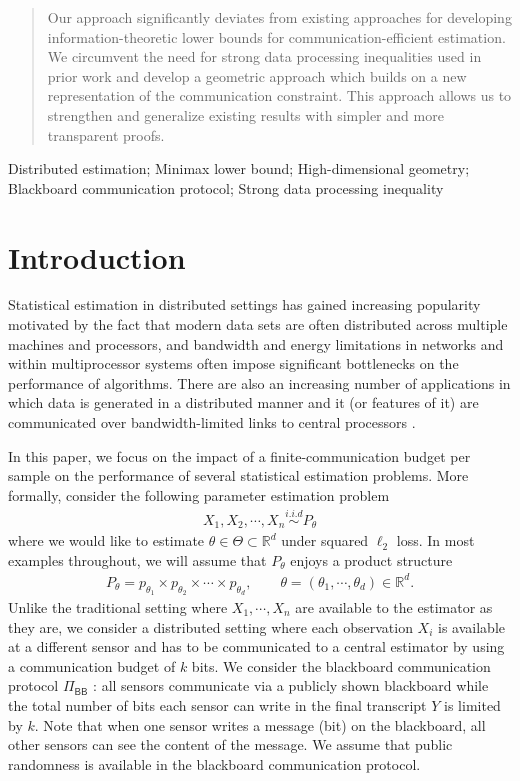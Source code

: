 \documentclass[final,12pt]{colt2018} %
\def \bR {\mathbb{R}}
\begin{document}
\begin{abstract}
Our approach significantly deviates from existing approaches for developing information-theoretic lower bounds for communication-efficient estimation. We circumvent the need
for strong data processing inequalities used in prior work and develop a geometric approach which builds on a new representation of the communication constraint. This approach allows us to strengthen and generalize existing results with simpler and more transparent proofs.
\end{abstract}

\begin{keywords}
Distributed estimation; Minimax lower bound; High-dimensional geometry; Blackboard communication protocol; Strong data processing inequality
\end{keywords}

\section{Introduction}
Statistical estimation in distributed settings has gained increasing
popularity motivated by the fact that modern data sets are often distributed across multiple machines and processors,
and bandwidth and energy limitations in networks and within
multiprocessor systems often impose significant bottlenecks
on the performance of algorithms. There are also an increasing
number of applications in which data is generated in a
distributed manner and it (or features of it) are communicated
over bandwidth-limited links to central processors \cite{boyd2011distributed,balcan2012distributed,daume2012protocols,daume2012efficient,dekel2012optimal}.

In this paper, we focus on the impact of a finite-communication budget per sample on the performance of several statistical estimation problems. More formally, consider the following parameter estimation problem
\begin{align*}
X_1, X_2, \cdots, X_n \overset{i.i.d}{\sim} P_\theta
\end{align*}
where we would like to estimate $\theta\in\Theta\subset \bR^d$ under squared $\ell_2$ loss. In most examples throughout, we will assume that $P_\theta$ enjoys a product structure
\begin{align*}
P_\theta = p_{\theta_1} \times p_{\theta_2} \times \cdots \times p_{\theta_d}, \qquad \theta=(\theta_1,\cdots,\theta_d)\in\bR^d.
\end{align*} 
Unlike the traditional setting where $X_1,\cdots,X_n$ are available to the estimator as they are, we consider a distributed setting where each observation $X_i$ is available at a different sensor and has to be communicated to a central estimator by using a communication budget of $k$ bits. We consider the blackboard communication protocol $\Pi_{\mathsf{BB}}$ \cite{kushilevitz1997communication}: all sensors communicate via a publicly shown blackboard while the total number of bits each sensor can write in the final transcript $Y$ is limited by $k$. Note that when one sensor writes a message (bit) on the blackboard, all other sensors can see the content of the message. We assume that public randomness is available in the blackboard communication protocol. 
\end{document}
